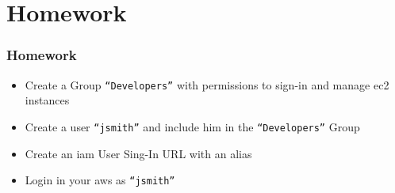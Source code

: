 \documentclass{beamer}
\begin{document}
\section{Homework}
\begin{frame}[fragile]
\frametitle{Homework}
\begin{itemize}
\item Create a Group \texttt{``Developers''} with permissions to sign-in and manage \acrshort{ec2} instances
\item Create a user \texttt{``jsmith''} and include him in the \texttt{``Developers''} Group
\item Create an \acrshort{iam} User Sing-In URL with an alias
\item Login in your \acrshort{aws} as \texttt{``jsmith''}
\end{itemize}
\end{frame}


\end{document}
